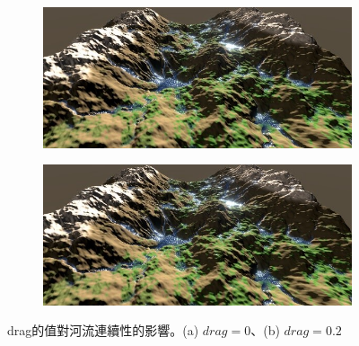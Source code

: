 \documentclass[a4paper, 12pt]{article}
\begin{document}
\begin{figure}[htbp]
    \begin{subfigure}{0.45\textwidth}
        \includegraphics[width=\linewidth]{fig/1a.jpg}
        \caption{} \label{fig:1a}
    \end{subfigure}%
    \hspace*{\fill}   %
    \begin{subfigure}{0.45\textwidth}
        \includegraphics[width=\linewidth]{fig/1a.jpg}
        \caption{} \label{fig:1b}
    \end{subfigure}%
    \caption{drag的值對河流連續性的影響。(a) $drag = 0$、(b) $drag = 0.2$} \label{fig:1}
\end{figure}
\end{document}
